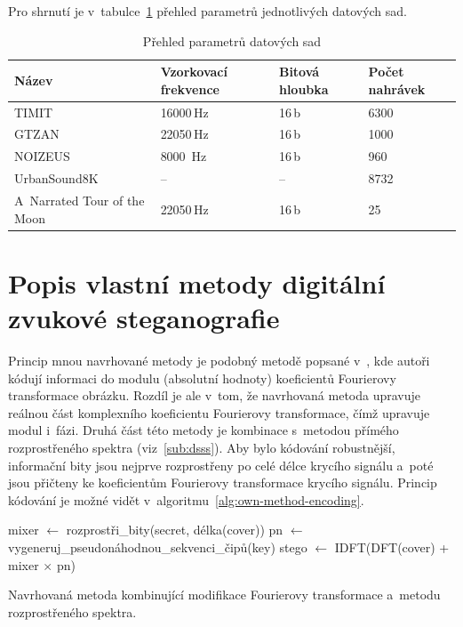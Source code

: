 Pro shrnutí je v~tabulce~\ref{tab:datasets} přehled parametrů jednotlivých
datových sad.

\begin{table}[H]
    \vskip6pt
    \caption{Přehled parametrů datových sad}
    \vskip6pt
    \centering
    \begin{tabular}{llll}
        \toprule
        Název & Vzorkovací frekvence & Bitová hloubka & Počet nahrávek \\
        \midrule
        TIMIT & 16000\,Hz & 16\,b & 6300 \\
        GTZAN & 22050\,Hz & 16\,b & 1000 \\
        NOIZEUS & 8000\, Hz & 16\,b & 960 \\
        UrbanSound8K & -- & -- & 8732 \\
        A~Narrated Tour of the Moon & 22050\,Hz & 16\,b & 25 \\
        \bottomrule
    \end{tabular}
    \label{tab:datasets}
\end{table}

\section{Popis vlastní metody digitální zvukové steganografie}
\label{sec:own-method-proposal}

Princip mnou navrhované metody je podobný metodě popsané v~\cite{Ramkumar1999},
kde autoři kódují informaci do modulu (absolutní hodnoty) koeficientů
Fourierovy transformace obrázku. Rozdíl je ale v~tom, že navrhovaná metoda
upravuje reálnou část komplexního koeficientu Fourierovy transformace, čímž
upravuje modul i~fázi. Druhá část této metody je kombinace s~metodou přímého
rozprostřeného spektra (viz~\ref{sub:dsss}). Aby bylo kódování robustnější,
informační bity jsou nejprve rozprostřeny po celé délce krycího signálu a~poté
jsou přičteny ke koeficientům Fourierovy transformace krycího signálu. Princip
kódování je možné vidět v~algoritmu~\ref{alg:own-method-encoding}.

\begin{algorithm}
    \SetNlSty{}{}{:}
    \LinesNumbered
    \DontPrintSemicolon
    \SetInd{0.4em}{1em}
    \SetNlSkip{0.4em}
    \Indm
    \Indp
    \BlankLine
    \SetInd{1em}{1em}
    mixer $\gets$ rozprostři\_bity(secret, délka(cover))\;
    pn $\gets$ vygeneruj\_pseudonáhodnou\_sekvenci\_čipů(key)\;
    stego $\gets$ IDFT(DFT(cover) + mixer $\times$ pn)\;
    \caption{Navrhovaná metoda kombinující modifikace Fourierovy transformace
    a~metodu rozprostřeného spektra.}
    \label{alg:own-method-encoding}
\end{algorithm}

